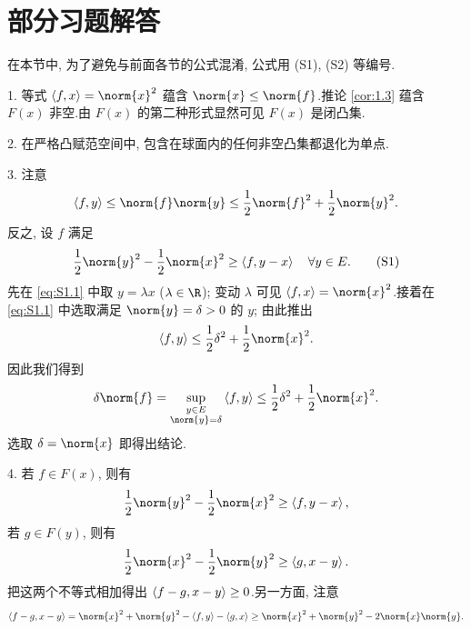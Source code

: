 
\chapter*{部分习题解答}

在本节中, 为了避免与前面各节的公式混淆, 公式用 (S1), (S2) 等编号.


1. 等式 $\dual{f}{x}=\norm{x}^2$ 蕴含 $\norm{x}\le\norm{f}$.推论  \ref{cor:1.3} 蕴含
$F(x)$ 非空.由 $F(x)$ 的第二种形式显然可见 $F(x)$ 是闭凸集.

2. 在严格凸赋范空间中, 包含在球面内的任何非空凸集都退化为单点.

3. 注意
\begin{equation*}
\dual{f}{y}\le\norm{f}\norm{y}\le\frac12\norm{f}^2+\frac12\norm{y}^2.
\end{equation*}
反之, 设 $f$ 满足
\begin{equation}
\frac12\norm{y}^2-\frac12\norm{x}^2\ge\dual{f}{y-x}\quad\forall y\in E.
\tag{S1}
\label{eq:S1.1}
\end{equation}
先在 \eqref{eq:S1.1} 中取 $y=\lambda x$ ($\lambda\in\R$); 变动 $\lambda$
可见 $\dual{f}{x}=\norm{x}^2$.接着在 \eqref{eq:S1.1} 中选取满足
$\norm{y}=\delta>0$ 的 $y$; 由此推出
\begin{equation*}
\dual{f}{y}\le\frac12\delta^2+\frac12\norm{x}^2.
\end{equation*}
因此我们得到
\begin{equation*}
\delta\norm{f}=\sup_{\substack{y\in E\\\norm{y}=\delta}}\dual{f}{y}
\le\frac12\delta^2+\frac12\norm{x}^2.
\end{equation*}
选取 $\delta=\norm{x}$ 即得出结论.

4. 若 $f\in F(x)$, 则有
\begin{equation*}
\frac12\norm{y}^2-\frac12\norm{x}^2\ge\dual{f}{y-x},
\end{equation*}
若 $g\in F(y)$, 则有
\begin{equation*}
\frac12\norm{x}^2-\frac12\norm{y}^2\ge\dual{g}{x-y}.
\end{equation*}
把这两个不等式相加得出 $\left\langle f-g,x-y\right\rangle\ge0$.另一方面, 注意
\begin{equation*}
\dual{f-g}{x-y}=\norm{x}^2+\norm{y}^2-\dual{f}{y}-\dual{g}{x}
\ge\norm{x}^2+\norm{y}^2-2\norm{x}\norm{y}.
\end{equation*}

